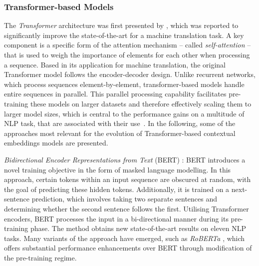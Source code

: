 \documentclass[11pt, numbers=noenddot]{scrreprt}
\let\cite\parencite  %
\begin{document}
\subsubsection{Transformer-based Models}
The \textit{Transformer} architecture was first presented by \cite{vaswaniAttentionAllYou2017}, which was reported to significantly improve the state-of-the-art for a  machine translation task. A key component is a specific form of the attention mechanism -- called \textit{self-attention} -- that is used to weigh the importance of elements for each other when processing a sequence. Based in its application for machine translation, the original Transformer model follows the encoder-decoder design. Unlike recurrent networks, which process sequences element-by-element, transformer-based models handle entire sequences in parallel. This parallel processing capability facilitates pre-training these models on larger datasets and therefore effectively scaling them to larger model sizes, which is central to the performance gains on a multitude of NLP task, that are associated with their use \cite{minRecentAdvancesNatural2023}. In the following, some of the approaches most relevant for the evolution of Transformer-based contextual embeddings models are presented.


\textit{Bidirectional Encoder Representations from Text} (BERT) \cite{devlinBERTPretrainingDeep2019}: BERT introduces a novel training objective in the form of masked language modelling. In this approach, certain tokens within an input sequence are obscured at random, with the goal of predicting these hidden tokens. Additionally, it is trained on a next-sentence prediction, which involves taking two separate sentences and determining whether the second sentence follows the first. Utilising Transformer encoders, BERT processes the input in a bi-directional manner during its pre-training phase. The method obtains new state-of-the-art results on eleven NLP tasks. Many variants of the approach have emerged, such as \textit{RoBERTa} \cite{liuRoBERTaRobustlyOptimized2019}, which offers substantial performance enhancements over BERT through modification of the pre-training regime.



\end{document}
